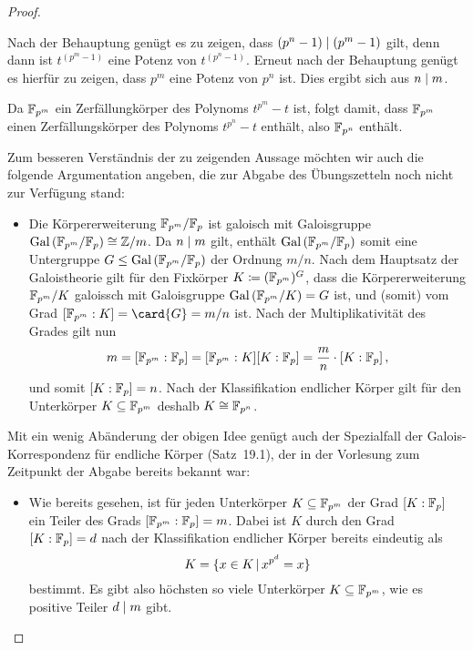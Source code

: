 \begin{proof}
\begin{itemize}
\begin{itemize}
          Nach der Behauptung genügt es zu zeigen, dass $(p^n - 1) \mathrel{|} (p^m - 1)$ gilt, denn dann ist $t^{(p^m - 1)}$ eine Potenz von $t^{(p^n - 1)}$.
          Erneut nach der Behauptung genügt es hierfür zu zeigen, dass $p^m$ eine Potenz von $p^n$ ist.
          Dies ergibt sich aus $n \mathrel{|} m$.
      \end{itemize}
      
      Da $\mathbb{F}_{p^m}$ ein Zerfällungkörper des Polynoms $t^{p^m} - t$ ist, folgt damit, dass $\mathbb{F}_{p^m}$ einen Zerfällungskörper des Polynoms $t^{p^n} - t$ enthält, also $\mathbb{F}_{p^n}$ enthält.
  \end{itemize}
  Zum besseren Verständnis der zu zeigenden Aussage möchten wir auch die folgende Argumentation angeben, die zur Abgabe des Übungszetteln noch nicht zur Verfügung stand:
  \begin{itemize}[resume]
    \item
      Die Körpererweiterung $\mathbb{F}_{p^m}/\mathbb{F}_{p}$ ist galoisch mit Galoisgruppe $\operatorname{Gal}{(}\mathbb{F}_{p^m}/\mathbb{F}_{p}) \cong \mathbb{Z}/m$.
      Da $n \mathrel{|} m$ gilt, enthält $\operatorname{Gal}{(}\mathbb{F}_{p^m}/\mathbb{F}_{p})$ somit eine Untergruppe $G \leq \operatorname{Gal}{(}\mathbb{F}_{p^m}/\mathbb{F}_{p})$ der Ordnung $m/n$.
      Nach dem Hauptsatz der Galoistheorie gilt für den Fixkörper $K \coloneqq (\mathbb{F}_{p^m})^G$, dass die Körpererweiterung $\mathbb{F}_{p^m}/K$ galoissch mit Galoisgruppe $\operatorname{Gal}{(}\mathbb{F}_{p^m}/K) = G$ ist, und (somit) vom Grad $[\Finite{p^m} : K] = \card{G} = m/n$ ist.
      Nach der Multiplikativität des Grades gilt nun
      \[
          m
        = [\mathbb{F}_{p^m} : \mathbb{F}_{p}]
        = [\mathbb{F}_{p^m} : K] [K : \mathbb{F}_{p}]
        = \frac{m}{n} \cdot [K : \mathbb{F}_{p}] \,,
      \]
      und somit $[K : \mathbb{F}_{p}] = n$.
      Nach der Klassifikation endlicher Körper gilt für den Unterkörper $K \subseteq \mathbb{F}_{p^m}$ deshalb $K \cong \mathbb{F}_{p^n}$.
  \end{itemize}
  Mit ein wenig Abänderung der obigen Idee genügt auch der Spezialfall der Galois-Korrespondenz für endliche Körper (Satz~19.1), der in der Vorlesung zum Zeitpunkt der Abgabe bereits bekannt war:
  \begin{itemize}[resume]
    \item
      Wie bereits gesehen, ist für jeden Unterkörper $K \subseteq \mathbb{F}_{p^m}$ der Grad $[K : \mathbb{F}_{p}]$ ein Teiler des Grads $[\mathbb{F}_{p^m} : \mathbb{F}_{p}] = m$.
      Dabei ist $K$ durch den Grad $[K : \mathbb{F}_{p}] = d$ nach der Klassifikation endlicher Körper bereits eindeutig als
      \[
          K
        = \{
            x \in K
          \suchthat
            x^{p^d} = x
          \}
      \]
      bestimmt.
      Es gibt also höchsten so viele Unterkörper $K \subseteq \mathbb{F}_{p^m}$, wie es positive Teiler $d \mathrel{|} m$ gibt.
      

\end{itemize}
\end{proof}

